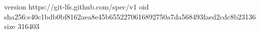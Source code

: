 version https://git-lfs.github.com/spec/v1
oid sha256:e40c1bdb0bf8162aea8e45b6552270616892750a7da568493faed2cdc8b23136
size 316403

